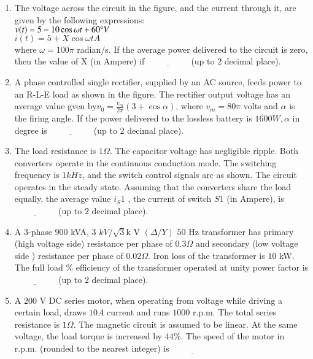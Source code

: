 \documentclass[journal,12pt,onecolumn]{IEEEtran}
\theoremstyle{remark}
\begin{document}
\begin{enumerate}
\item The voltage across the circuit in the figure, and the current through it, are given by the following expressions: \\
$v(t)=5-10 \cos{\omega t+60\degree}V$\\
$i(t)=5+X \cos{\omega t}A$\\
where $\omega=100\pi$ radian/s. If the average power delivered to the circuit is zero, then the value of X (in Ampere) if $\underline{\hspace{2cm}}$  (up to $2$ decimal place).\\


\item A phase controlled single rectifier, supplied by an AC source, feeds power to an R-L-E load as shown in the figure. The rectifier output  voltage has an average value gven by$v_0=\frac{v_m}{2\pi}(3+\cos{\alpha})$, where $v_m=80\pi$ volts and $\alpha$ is the firing angle. If the power delivered to the lossless battery is $1600 W, \alpha$ in degree is $\underline{\hspace{2cm}}$  (up to $2$ decimal place).\\


\item The load resistance is $1 \Omega.$ The capacitor voltage has negligible ripple. Both converters operate in the continuous conduction mode. The switching frequency is $1 kHz$, and the switch control signals arc as shown. The circuit operates in the steady state. Assuming that the converters share the load equally, the average value $i_S1$ , the current of switch $S1$ (in Ampere), is $\underline{\hspace{2cm}}$  (up to $2$ decimal place).\\


\item A $3$-phase $900$ kVA, $3$ $kV / \sqrt{3} $k V $(\Delta/Y)$ $50$ Hz transformer has primary (high voltage side) resistance per phase of $0.3 \Omega$ and secondary (low voltage side ) resistance per phase of $0.02 \Omega$. Iron loss of the transformer is $10$ kW. The full load \% efficiency of the transformer operated at unity power factor is $\underline{\hspace{2cm}}$  (up to $2$ decimal place).\\

\item A $200$ V DC series motor, when operating from voltage while driving a certain load, draws $10 A$ current and runs $1000$ r.p.m. The total series resistance is $1 \Omega$. The magnetic circuit is assumed to be linear. At the same voltage, the load torque is increased by $44\%$. The speed of the motor in r.p.m. (rounded to the nearest integer) is $\underline{\hspace{2cm}}$ \\


\end{enumerate}
\end{document}
